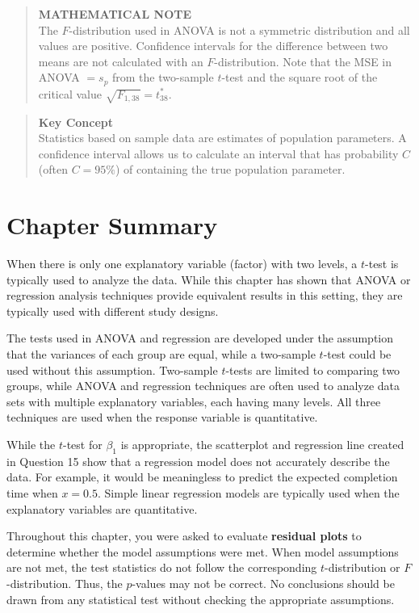 \documentclass[
]{report}
\begin{document}
\begin{quote}
\textbf{MATHEMATICAL NOTE}\\
The \(F\)-distribution used in ANOVA is not a symmetric distribution and all values are positive. Confidence intervals for the difference between two means are not calculated with an \(F\)-distribution. Note that the MSE in ANOVA \(= s_p\) from the two-sample \(t\)-test and the square root of the critical value \(\sqrt{F_{1,38}} = t^*_{38}\).
\end{quote}

\begin{quote}
\textbf{Key Concept}\\
Statistics based on sample data are estimates of population parameters. A confidence interval allows us to calculate an interval that has probability \(C\) (often \(C=95\%\)) of containing the true population parameter.
\end{quote}

\section*{\texorpdfstring{\textbf{Chapter Summary}}{Chapter Summary}}\label{chapter-summary-1}

When there is only one explanatory variable (factor) with two levels, a \(t\)-test is typically used to analyze the data. While this chapter has shown that ANOVA or regression analysis techniques provide equivalent results in this setting, they are typically used with different study designs.

The tests used in ANOVA and regression are developed under the assumption that the variances of each group are equal, while a two-sample \(t\)-test could be used without this assumption. Two-sample \(t\)-tests are limited to comparing two groups, while ANOVA and regression techniques are often used to analyze data sets with multiple explanatory variables, each having many levels. All three techniques are used when the response variable is quantitative.

While the \(t\)-test for \(\beta_1\) is appropriate, the scatterplot and regression line created in Question 15 show that a regression model does not accurately describe the data. For example, it would be meaningless to predict the expected completion time when \(x = 0.5\). Simple linear regression models are typically used when the explanatory variables are quantitative.

Throughout this chapter, you were asked to evaluate \textbf{residual plots} to determine whether the model assumptions were met. When model assumptions are not met, the test statistics do not follow the corresponding \(t\)-distribution or \(F\)-distribution. Thus, the \(p\)-values may not be correct. No conclusions should be drawn from any statistical test without checking the appropriate assumptions.
\end{document}
